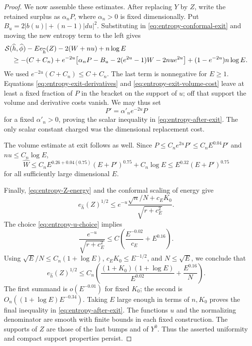 \begin{proof}
We now assemble these estimates.  After replacing \(Y\) by \(Z\), write
the retained surplus as \(\alpha_n P\), where \(\alpha_n>0\) is fixed
dimensionally.  Put \(B_u=2|b(u)|+(n-1)|du|^2\).  Substituting in
\eqref{eq:entropy-conformal-exit} and moving the new entropy term
to the left gives
\begin{align*}
 &\mathcal S(\widehat h,\widehat\phi)
       -E e_{\widehat h}(Z)-2(W+nu)+n\log E\\
 &\quad\geq -(C+C_n)
   +e^{-2u}\bigl[\alpha_n P-B_u
            -2(e^{2u}-1)W-2nu e^{2u}\bigr]
   +(1-e^{-2u})n\log E .
\end{align*}
We used \(e^{-2u}(C+C_n)\leq C+C_n\).  The last term is nonnegative
for \(E\geq1\).  Equations \eqref{eq:entropy-exit-derivatives} and
\eqref{eq:entropy-exit-volume-cost} leave at least a fixed fraction
of \(P\) in the bracket on the support of \(u\); off that support the
volume and derivative costs vanish.  We may thus set
\[
 P'=\alpha'_n e^{-2u}P
\]
for a fixed \(\alpha'_n>0\), proving the scalar inequality in
\eqref{eq:entropy-after-exit}.  The only scalar constant charged was
the dimensional replacement cost.

The volume estimate at exit follows as well.  Since
\(P\leq C_ne^{2u}P'\leq C_nE^{0.04}P'\) and \(nu\leq C_n\log E\),
\[
 \widehat W\leq
 C_n E^{0.26+0.04(0.75)}(E+P')^{0.75}+C_n\log E
 \leq E^{0.32}(E+P')^{0.75}
\]
for all sufficiently large dimensional \(E\).

Finally, \eqref{eq:entropy-Z-energy} and the conformal scaling of
energy give
\[
 e_{\widehat h}(Z)^{1/2}
 \leq e^{-u}\frac{\sqrt n/N+c_EK_0}{\sqrt{r+c_E^2}}.
\]
The choice \eqref{eq:entropy-u-choice} implies
\[
 \frac{e^{-u}}{\sqrt{r+c_E^2}}
       \leq C\left(\frac{E^{-0.02}}{c_E}+E^{0.16}\right).
\]
Using \(\sqrt E/N\leq C_n(1+\log E)\), \(c_EK_0\leq E^{-1/2}\),
and \(N\leq\sqrt E\), we conclude that
\begin{equation}\label{eq:entropy-exit-gradient}
 e_{\widehat h}(Z)^{1/2}
 \leq C_n\left(
 \frac{(1+K_0)(1+\log E)}{E^{0.02}}+\frac{E^{0.16}}{N}\right).
\end{equation}
The first summand is \(o(E^{-0.01})\) for fixed \(K_0\); the second is
\(O_n((1+\log E)E^{-0.34})\).  Taking \(E\) large enough in terms of
\(n,K_0\) proves the final inequality in
\eqref{eq:entropy-after-exit}.  The functions \(u\) and the normalizing
denominator are smooth with finite bounds in each fixed construction.
The supports of \(Z\) are those of the last bumps and of \(Y^0\).
Thus the asserted uniformity and compact support properties persist.
\end{proof}

